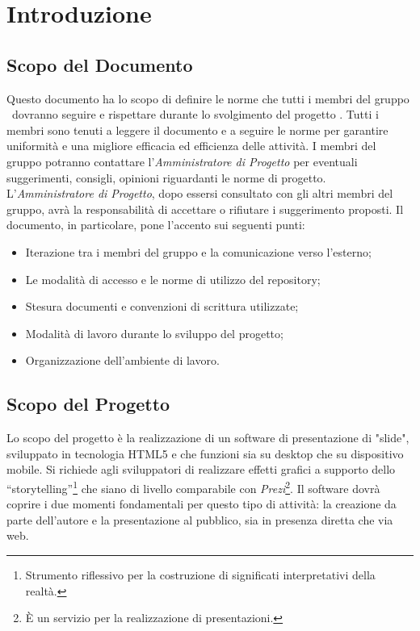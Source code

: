 \section{Introduzione}
	\subsection{Scopo del Documento}
Questo documento ha lo scopo di definire le norme che tutti i membri del gruppo \GRUPPO\ dovranno seguire e rispettare durante lo svolgimento del progetto \PROGETTO. Tutti i membri sono tenuti a leggere il documento e a seguire le norme per garantire uniformità e una migliore efficacia ed efficienza delle attività.
I membri del gruppo potranno contattare l'\textit{Amministratore di Progetto} per eventuali suggerimenti, consigli, opinioni riguardanti le norme di progetto. 
L'\textit{Amministratore di Progetto}, dopo essersi consultato con gli altri membri del gruppo, avrà la responsabilità di accettare o rifiutare i suggerimento proposti. 
Il documento, in particolare, pone l'accento sui seguenti punti:

\begin{itemize}
	\item Iterazione tra i membri del gruppo e la comunicazione verso l'esterno;
	\item Le modalità di accesso e le norme di utilizzo del \gls{repository};
	\item Stesura documenti e convenzioni di scrittura utilizzate;
	\item Modalità di lavoro durante lo sviluppo del progetto;
	\item Organizzazione dell'ambiente di lavoro.
\end{itemize}

\subsection{Scopo del Progetto}
Lo scopo del progetto è la realizzazione di un software di presentazione di "slide", sviluppato in tecnologia \gls{HTML5} e che funzioni sia su desktop che su dispositivo mobile.
Si richiede agli sviluppatori di realizzare effetti grafici a supporto dello “storytelling”\footnote{Strumento riflessivo per la costruzione di significati interpretativi della realtà.} che siano di livello comparabile con \textit{Prezi}\footnote{È un servizio per la realizzazione di presentazioni.}.
Il software dovrà coprire i due momenti fondamentali per questo tipo di attività: la creazione da parte dell'autore e la presentazione al pubblico, sia in presenza diretta che via web.

